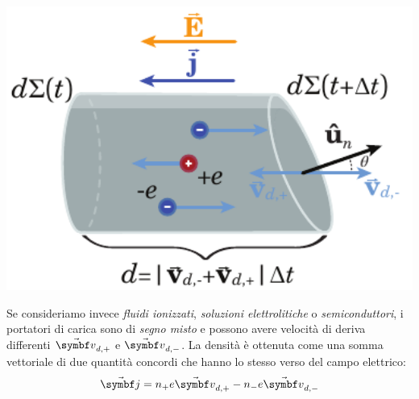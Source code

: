 \begin{minipage}{0.34\textwidth}
	\begin{center}
		\includegraphics[width=1\textwidth]{images/chp5/chp5correntecavo3.pdf}
	\end{center}
\end{minipage}\hspace{5pt}
\begin{minipage}{0.65\textwidth}
	Se consideriamo invece \textit{fluidi ionizzati}, \textit{soluzioni elettrolitiche} o \textit{semiconduttori}, i portatori di carica sono di \textit{segno misto} e possono avere velocità di deriva differenti $\vba{v}_{d,+}$ e $\vba{v}_{d,-}$. La densità è ottenuta come una somma vettoriale di due quantità concordi che hanno lo stesso verso del campo elettrico:
	\begin{equation}
		\vba{j}=n_{+}e\vba{v}_{d,+}-n_{-}e\vba{v}_{d,-}
	\end{equation}
\end{minipage}
